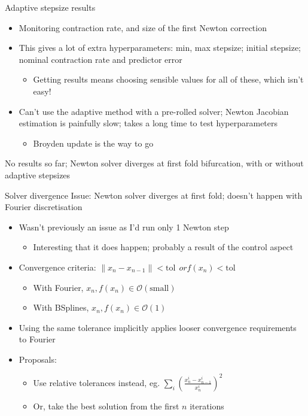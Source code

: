 \documentclass[presentation]{beamer}
\begin{document}
\begin{frame}[label={sec:orgcafad04}]{Adaptive stepsize results}
\begin{itemize}
\item Monitoring contraction rate, and size of the first Newton correction
\item This gives a lot of extra hyperparameters: min, max stepsize; initial stepsize; nominal contraction rate and predictor error
\begin{itemize}
\item Getting results means choosing sensible values for all of these, which isn't easy!
\end{itemize}
\item Can't use the adaptive method with a pre-rolled solver; Newton Jacobian estimation is painfully slow; takes a long time to test hyperparameters
\begin{itemize}
\item Broyden update is the way to go
\end{itemize}
\end{itemize}
\vfill
No results so far; Newton solver diverges at first fold bifurcation, with or without adaptive stepsizes
\end{frame}

\begin{frame}[label={sec:org7a91f97}]{Solver divergence}
Issue: Newton solver diverges at first fold; doesn't happen with Fourier discretisation
\begin{itemize}
\item Wasn't previously an issue as I'd run only 1 Newton step
\begin{itemize}
\item Interesting that it does happen; probably a result of the control aspect
\end{itemize}
\item Convergence criteria: \(\|x_n - x_{n-1}\|<\mathrm{tol} ~~or f(x_n)<\mathrm{tol}\)
\begin{itemize}
\item With Fourier, \(x_n, f(x_n) \in \mathcal{O}(\mathrm{small})\)
\item With BSplines, \(x_n, f(x_n) \in \mathcal{O}(1)\)
\end{itemize}
\item Using the same tolerance implicitly applies looser convergence requirements to Fourier
\item Proposals:
\begin{itemize}
\item Use relative tolerances instead, eg. \(\sum_i\left(\frac{x^i_n-x^i_{n-1}} {x^i_n} \right)^2\)
\item Or, take the best solution from the first \(n\) iterations
\end{itemize}
\end{itemize}
\end{frame}
\end{document}
